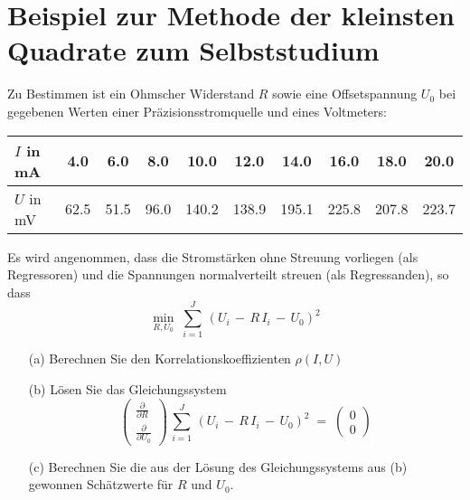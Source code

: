 \section{Beispiel zur Methode der kleinsten Quadrate zum Selbststudium}
\label{Kap1LMSbeispiel}
Zu Bestimmen ist ein Ohmscher Widerstand $R$ sowie eine Offsetspannung $U_0$ bei gegebenen Werten einer
Präzisionsstromquelle und eines Voltmeters:

\begin{center}
\begin{tabular}{l||c|c|c|c|c|c|c|c|c}
\hline\hline
 $I$ in mA &    4.0 &     6.0 &     8.0 &    10.0 &    12.0 &    14.0 &    16.0 &    18.0 &    20.0\\
\hline
 $U$ in mV &    62.5 &    51.5 &    96.0 &   140.2 &   138.9 &   195.1 &   225.8 &   207.8 &   223.7 \\
\hline\hline
\end{tabular}
\end{center}

Es wird angenommen, dass die Stromstärken ohne Streuung vorliegen (als Regressoren) und die Spannungen normalverteilt
streuen (als Regressanden), so dass
\begin{equation}
\min_{R, U_0} \; \sum_{i = 1}^J \, \left(U_i \, - \, R \, I_i  \, - \,  U_0\right)^2
\label{regrGer}
\end{equation}

\begin{itemize}
\item[(a)] Berechnen Sie den Korrelationskoeffizienten $\rho(I, U)$
\item[(b)] Lösen Sie das Gleichungssystem
\begin{equation}
\left(\begin{array}{c}
\frac{\partial}{\partial R}\\
\frac{\partial}{\partial U_0}
\end{array}\right)
\, \sum_{i = 1}^J \, \left(U_i \, - \, R \, I_i  \, - \,  U_0\right)^2 \; = \;
\left(\begin{array}{c}
0\\
0
\end{array}\right)
\label{regrGerGS}
\end{equation}
\item[(c)] Berechnen Sie die aus der Lösung des Gleichungssystems aus (b) gewonnen Schätzwerte
für $R$ und $U_0$.
\end{itemize}
